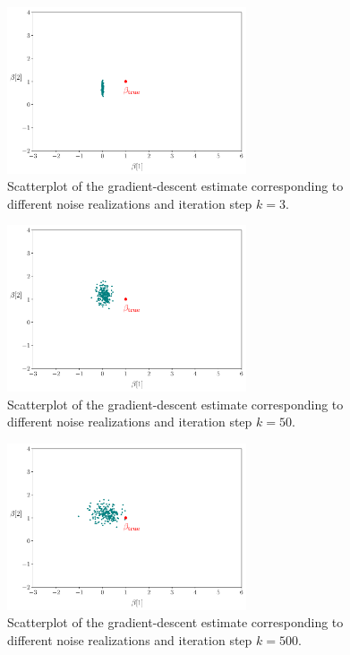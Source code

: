 \documentclass[12pt,twoside]{article}
\begin{document}
\begin{enumerate}
\begin{enumerate}
	\begin{figure}[H]
		\centering
		\captionsetup{justification=centering}
		\includegraphics[width=200pt]{code/Q1/RR_GD_scatterplot0.pdf}
		\caption{Scatterplot of the gradient-descent estimate \newline corresponding to different noise realizations and iteration step $k=3$.}
	\end{figure}

	\begin{figure}[H]
		\centering
		\captionsetup{justification=centering}
		\includegraphics[width=200pt]{code/Q1/RR_GD_scatterplot1.pdf}
		\caption{Scatterplot of the gradient-descent estimate \newline corresponding to different noise realizations and iteration step $k=50$.}
	\end{figure}

	\begin{figure}[H]
		\centering
		\captionsetup{justification=centering}
		\includegraphics[width=200pt]{code/Q1/RR_GD_scatterplot2.pdf}
		\caption{Scatterplot of the gradient-descent estimate \newline corresponding to different noise realizations and iteration step $k=500$.}
	\end{figure}


\end{enumerate}
\end{enumerate}
\end{document}
